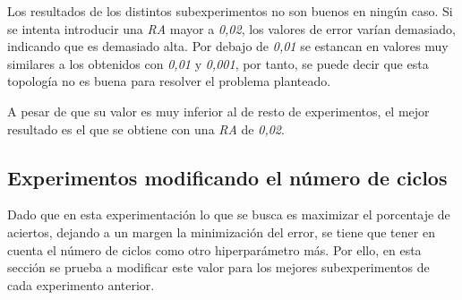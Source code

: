 \documentclass{uc3mpracticas}
\begin{document}
Los resultados de los distintos subexperimentos no son buenos en ningún caso. Si se intenta introducir una \textit{RA} mayor a \textit{0,02}, los valores de error varían demasiado, indicando que es demasiado alta. Por debajo de \textit{0,01} se estancan en valores muy similares a los obtenidos con \textit{0,01} y \textit{0,001}, por tanto, se puede decir que esta topología no es buena para resolver el problema planteado.

\vspace{1mm}

A pesar de que su valor es muy inferior al de resto de experimentos, el mejor resultado es el que se obtiene con una \textit{RA} de \textit{0,02}.



\subsection{Experimentos modificando el número de ciclos}

Dado que en esta experimentación lo que se busca es maximizar el porcentaje de aciertos, dejando a un margen la minimización del error, se tiene que tener en cuenta el número de ciclos como otro hiperparámetro más. Por ello, en esta sección se prueba a modificar este valor para los mejores subexperimentos de cada experimento anterior.
\end{document}
